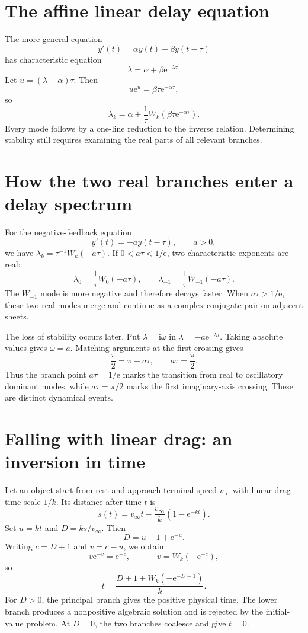 \documentclass[11pt,openany]{book}
\newcommand{\e}{\mathrm{e}}
\newcommand{\ii}{\mathrm{i}}
\theoremstyle{plain}
\theoremstyle{definition}
\theoremstyle{remark}
\begin{document}
\section{The affine linear delay equation}
The more general equation
\begin{equation}\label{eq:affineDDE}
       y'(t)=\alpha y(t)+\beta y(t-\tau)
\end{equation}
has characteristic equation
\[
       \lambda=\alpha+\beta\e^{-\lambda\tau}.
\]
Let \(u=(\lambda-\alpha)\tau\).  Then
\[
       u\e^u=\beta\tau\e^{-\alpha\tau},
\]
so
\begin{equation}\label{eq:affineDDEspectrum}
       \lambda_k=\alpha+\frac1\tau
       W_k\!\left(\beta\tau\e^{-\alpha\tau}\right).
\end{equation}
Every mode follows by a one-line reduction to the inverse relation.
Determining stability still requires examining the real parts of all relevant
branches.

\section{How the two real branches enter a delay spectrum}
For the negative-feedback equation
\[
             y'(t)=-a y(t-\tau),
             \qquad a>0,
\]
we have \(\lambda_k=\tau^{-1}W_k(-a\tau)\).  If
\(0<a\tau<1/\e\), two characteristic exponents are real:
\[
       \lambda_0=\frac1\tau W_0(-a\tau),
       \qquad
       \lambda_{-1}=\frac1\tau W_{-1}(-a\tau).
\]
The \(W_{-1}\) mode is more negative and therefore decays faster.  When
\(a\tau>1/\e\), these two real modes merge and continue as a complex-conjugate
pair on adjacent sheets.

The loss of stability occurs later.  Put \(\lambda=\ii\omega\) in
\(\lambda=-a\e^{-\lambda\tau}\).  Taking absolute values gives
\(\omega=a\).  Matching arguments at the first crossing gives
\[
       \frac\pi2=\pi-a\tau,
       \qquad a\tau=\frac\pi2.
\]
Thus the branch point \(a\tau=1/\e\) marks the transition from real to
oscillatory dominant modes, while \(a\tau=\pi/2\) marks the first imaginary-axis
crossing.  These are distinct dynamical events.

\section{Falling with linear drag: an inversion in time}
Let an object start from rest and approach terminal speed \(v_\infty\) with
linear-drag time scale \(1/k\).  Its distance after time \(t\) is
\[
 s(t)=v_\infty t-\frac{v_\infty}{k}(1-\e^{-kt}).
\]
Set \(u=kt\) and \(D=ks/v_\infty\).  Then
\[
       D=u-1+\e^{-u}.
\]
Writing \(c=D+1\) and \(v=c-u\), we obtain
\[
       v\e^{-v}=\e^{-c},
       \qquad
       -v=W_k(-\e^{-c}),
\]
so
\begin{equation}\label{eq:fallingtime}
       t=\frac{D+1+W_k(-\e^{-D-1})}{k}.
\end{equation}
For \(D>0\), the principal branch gives the positive physical time.  The
lower branch produces a nonpositive algebraic solution and is rejected by the
initial-value problem.  At \(D=0\), the two branches coalesce and give
\(t=0\).
\end{document}
